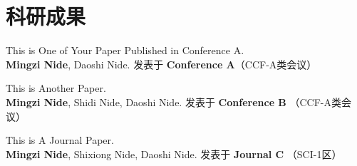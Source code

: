 \documentclass[11pt]{article}
\begin{document}
    \hfill
    \begin{minipage}[b]{0.2\textwidth}
        \setlength{\fboxsep}{0pt}
        \vspace{11em} %
    \end{minipage}

    \section{\makebox[\widthof{\faGraduationCap}][c]{\color{primary_color}{\faGraduationCap}}\quad 科研成果}

    This is One of Your Paper Published in Conference A. \\
    \textbf{Mingzi Nide}, Daoshi Nide. \hfill 
    发表于 \textbf{Conference A}（CCF-A类会议） 

    \vspace{0.5em}
    This is Another Paper. \\
    \textbf{Mingzi Nide}, Shidi Nide, Daoshi Nide. \hfill 
    发表于 \textbf{Conference B} （CCF-A类会议）

    \vspace{0.5em}
    This is A Journal Paper.\\
    \textbf{Mingzi Nide}, Shixiong Nide, Daoshi Nide. \hfill 
    发表于 \textbf{Journal C} （SCI-1区）
\end{document}
